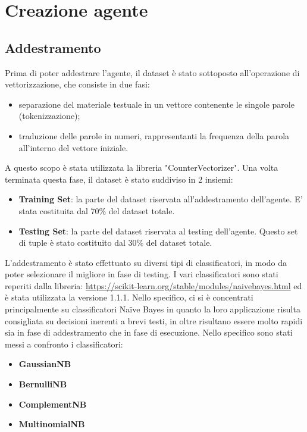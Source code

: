 \documentclass{report}
\begin{document}
    \chapter{Creazione agente}
    \section{Addestramento}
    Prima di poter addestrare l'agente, il dataset è stato sottoposto all'operazione di vettorizzazione, che consiste in due fasi:
    \begin{itemize}
        \item separazione del materiale testuale in un vettore contenente le singole parole (tokenizzazione);
        \item traduzione delle parole in numeri, rappresentanti la frequenza della parola all'interno del vettore iniziale.
    \end{itemize}
    A questo scopo è stata utilizzata la libreria "CounterVectorizer".
    \newline
    Una volta terminata questa fase, il dataset è stato suddiviso in 2 insiemi:
    \begin{itemize}
        \item {\bfseries Training Set}: la parte del dataset riservata all'addestramento dell'agente. E' stata costituita dal 
        70\% del dataset totale.
        \item {\bfseries Testing Set}: la parte del dataset riservata al testing dell'agente. Questo set di tuple è stato 
        costituito dal 30\% del dataset totale.
    \end{itemize}
    L'addestramento è stato effettuato su diversi tipi di classificatori, in modo da poter selezionare il migliore in fase di testing.
    I vari classificatori sono stati reperiti dalla libreria: \href{https://scikit-learn.org/stable/modules/naive_bayes.html}{https://scikit-learn.org/stable/modules/naive\textunderscore bayes.html}
    ed è stata utilizzata la versione 1.1.1.
    Nello specifico, ci si è concentrati principalmente su classificatori Naïve Bayes in quanto la loro applicazione risulta consigliata
    su decisioni inerenti a brevi testi, in oltre risultano essere molto rapidi sia in fase di addestramento che in fase di esecuzione.
    Nello specifico sono stati messi a confronto i classificatori:
    \begin{itemize}
        \item {\bfseries GaussianNB}
        \item {\bfseries BernulliNB}
        \item {\bfseries ComplementNB}
        \item {\bfseries MultinomialNB}
    \end{itemize}
\end{document}

